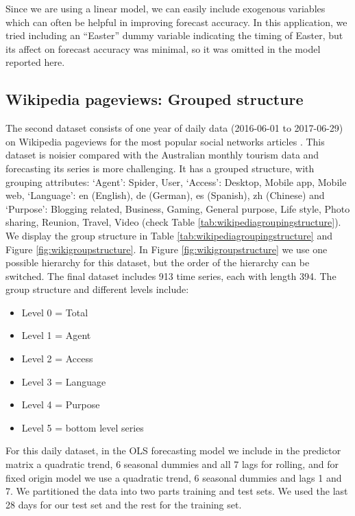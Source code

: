 \documentclass[11pt,a4paper,]{article}
\providecommand{\tightlist}{%
  \setlength{\itemsep}{0pt}\setlength{\parskip}{0pt}}
\begin{document}
Since we are using a linear model, we can easily include exogenous
variables which can often be helpful in improving forecast accuracy. In
this application, we tried including an ``Easter'' dummy variable
indicating the timing of Easter, but its affect on forecast accuracy was
minimal, so it was omitted in the model reported here.

\FloatBarrier

\hypertarget{wikipedia-pageviews-grouped-structure}{%
\subsection{Wikipedia pageviews: Grouped
structure}\label{wikipedia-pageviews-grouped-structure}}

The second dataset consists of one year of daily data (2016-06-01 to
2017-06-29) on Wikipedia pageviews for the most popular social networks
articles \autocite{ashouri2018}. This dataset is noisier compared with
the Australian monthly tourism data and forecasting its series is more
challenging. It has a grouped structure, with grouping attributes:
`Agent': Spider, User, `Access': Desktop, Mobile app, Mobile web,
`Language': en (English), de (German), es (Spanish), zh (Chinese) and
`Purpose': Blogging related, Business, Gaming, General purpose, Life
style, Photo sharing, Reunion, Travel, Video (check Table
\ref{tab:wikipediagroupingstructure}). We display the group structure in
Table \ref{tab:wikipediagroupingstructure} and Figure
\ref{fig:wikigroupstructure}. In Figure \ref{fig:wikigroupstructure} we
use one possible hierarchy for this dataset, but the order of the
hierarchy can be switched. The final dataset includes 913 time series,
each with length 394. The group structure and different levels include:

\begin{itemize}
\tightlist
\item
  Level 0 = Total
\item
  Level 1 = Agent
\item
  Level 2 = Access
\item
  Level 3 = Language
\item
  Level 4 = Purpose
\item
  Level 5 = bottom level series
\end{itemize}

For this daily dataset, in the OLS forecasting model we include in the
predictor matrix a quadratic trend, 6 seasonal dummies and all 7 lags
for rolling, and for fixed origin model we use a quadratic trend, 6
seasonal dummies and lags 1 and 7. We partitioned the data into two
parts training and test sets. We used the last 28 days for our test set
and the rest for the training set.
\end{document}
